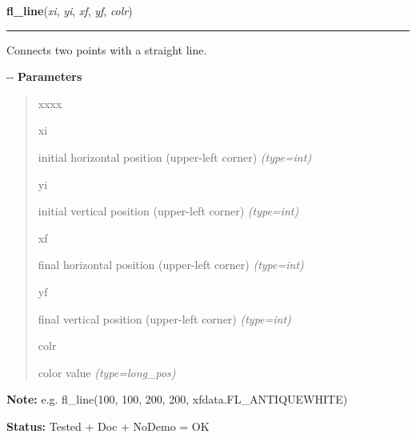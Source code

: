     \label{xformslib:flxbasic:fl_line}

    \vspace{0.5ex}

\hspace{.8\funcindent}\begin{boxedminipage}{\funcwidth}

    \raggedright \textbf{fl\_line}(\textit{xi}, \textit{yi}, \textit{xf}, \textit{yf}, \textit{colr})

    \vspace{-1.5ex}

    \rule{\textwidth}{0.5\fboxrule}
\setlength{\parskip}{2ex}

Connects two points with a straight line.

-{}-
\setlength{\parskip}{1ex}
      \textbf{Parameters}
      \vspace{-1ex}

      \begin{quote}
        \begin{Ventry}{xxxx}

          \item[xi]


initial horizontal position (upper-left corner)
            {\it (type=int)}

          \item[yi]


initial vertical position (upper-left corner)
            {\it (type=int)}

          \item[xf]


final horizontal position (upper-left corner)
            {\it (type=int)}

          \item[yf]


final vertical position (upper-left corner)
            {\it (type=int)}

          \item[colr]


color value
            {\it (type=long\_pos)}

        \end{Ventry}

      \end{quote}

\textbf{Note:} 
e.g. fl\_line(100, 100, 200, 200, xfdata.FL\_ANTIQUEWHITE)


\textbf{Status:} 
Tested + Doc + NoDemo = OK


    \end{boxedminipage}

